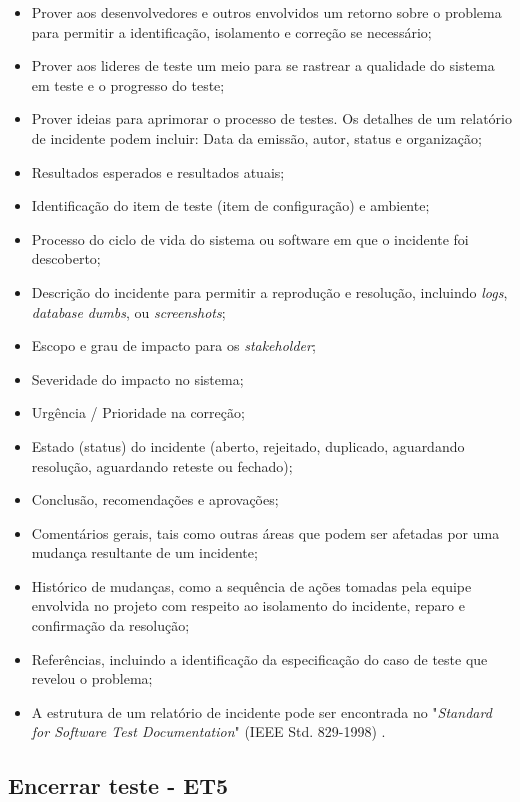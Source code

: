 \begin{itemize}
    \item Prover aos desenvolvedores e outros envolvidos um retorno sobre o problema para permitir a identificação, isolamento e correção se necessário;
    \item Prover aos lideres de teste um meio para se rastrear a qualidade do sistema em teste e o progresso do teste;
    \item Prover ideias para aprimorar o processo de testes. Os detalhes de um relatório de incidente podem incluir: Data da emissão, autor, status e organização;
    \item Resultados esperados e resultados atuais;
    \item Identificação do item de teste (item de configuração) e ambiente;
    \item Processo do ciclo de vida do sistema ou software em que o incidente foi descoberto;
    \item Descrição do incidente para permitir a reprodução e resolução, incluindo \textit{logs}, \textit{database} \textit{dumbs}, ou \textit{screenshots};
    \item Escopo e grau de impacto para os \textit{stakeholder};
    \item Severidade do impacto no sistema;
    \item Urgência / Prioridade na correção;
    \item Estado (status) do incidente (aberto, rejeitado, duplicado, aguardando resolução, aguardando reteste ou fechado);
    \item Conclusão, recomendações e aprovações;
    \item Comentários gerais, tais como outras áreas que podem ser afetadas por uma mudança resultante de um incidente;
    \item Histórico de mudanças, como a sequência de ações tomadas pela equipe envolvida no projeto com respeito ao isolamento do incidente, reparo e confirmação da resolução;
    \item Referências, incluindo a identificação da especificação do caso de teste que revelou o problema;
    \item A estrutura de um relatório de incidente pode ser encontrada no "\textit{Standard for Software Test Documentation}" (IEEE Std. 829-1998) \cite{ieee829}.
\end{itemize}

\subsection{Encerrar teste - ET5}
\label{sec:guiaet5}

